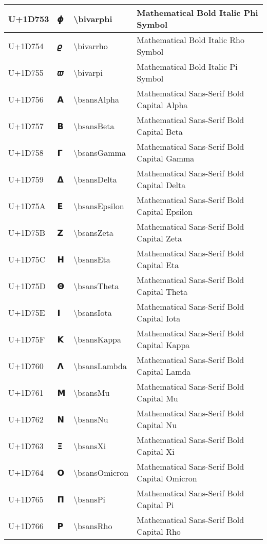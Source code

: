 \begin{table}[h]
\begin{tabulary}{\linewidth}{|L|L|L|L|}
\hline
U+1D753 & 𝝓 & {\textbackslash}bivarphi & Mathematical Bold Italic Phi Symbol \\
\hline
U+1D754 & 𝝔 & {\textbackslash}bivarrho & Mathematical Bold Italic Rho Symbol \\
\hline
U+1D755 & 𝝕 & {\textbackslash}bivarpi & Mathematical Bold Italic Pi Symbol \\
\hline
U+1D756 & 𝝖 & {\textbackslash}bsansAlpha & Mathematical Sans-Serif Bold Capital Alpha \\
\hline
U+1D757 & 𝝗 & {\textbackslash}bsansBeta & Mathematical Sans-Serif Bold Capital Beta \\
\hline
U+1D758 & 𝝘 & {\textbackslash}bsansGamma & Mathematical Sans-Serif Bold Capital Gamma \\
\hline
U+1D759 & 𝝙 & {\textbackslash}bsansDelta & Mathematical Sans-Serif Bold Capital Delta \\
\hline
U+1D75A & 𝝚 & {\textbackslash}bsansEpsilon & Mathematical Sans-Serif Bold Capital Epsilon \\
\hline
U+1D75B & 𝝛 & {\textbackslash}bsansZeta & Mathematical Sans-Serif Bold Capital Zeta \\
\hline
U+1D75C & 𝝜 & {\textbackslash}bsansEta & Mathematical Sans-Serif Bold Capital Eta \\
\hline
U+1D75D & 𝝝 & {\textbackslash}bsansTheta & Mathematical Sans-Serif Bold Capital Theta \\
\hline
U+1D75E & 𝝞 & {\textbackslash}bsansIota & Mathematical Sans-Serif Bold Capital Iota \\
\hline
U+1D75F & 𝝟 & {\textbackslash}bsansKappa & Mathematical Sans-Serif Bold Capital Kappa \\
\hline
U+1D760 & 𝝠 & {\textbackslash}bsansLambda & Mathematical Sans-Serif Bold Capital Lamda \\
\hline
U+1D761 & 𝝡 & {\textbackslash}bsansMu & Mathematical Sans-Serif Bold Capital Mu \\
\hline
U+1D762 & 𝝢 & {\textbackslash}bsansNu & Mathematical Sans-Serif Bold Capital Nu \\
\hline
U+1D763 & 𝝣 & {\textbackslash}bsansXi & Mathematical Sans-Serif Bold Capital Xi \\
\hline
U+1D764 & 𝝤 & {\textbackslash}bsansOmicron & Mathematical Sans-Serif Bold Capital Omicron \\
\hline
U+1D765 & 𝝥 & {\textbackslash}bsansPi & Mathematical Sans-Serif Bold Capital Pi \\
\hline
U+1D766 & 𝝦 & {\textbackslash}bsansRho & Mathematical Sans-Serif Bold Capital Rho \\

\end{tabulary}
\end{table}
